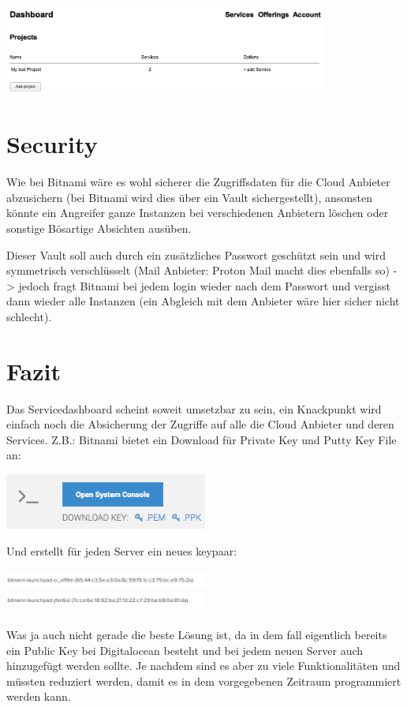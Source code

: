 \documentclass[11pt]{scrartcl}
\begin{document}
\includegraphics[width=0.8\textwidth]{account_projects.png}


\section{Security}
Wie bei Bitnami wäre es wohl sicherer die Zugriffsdaten für die Cloud Anbieter 
abzusichern (bei Bitnami wird dies über ein Vault sichergestellt), ansonsten 
könnte ein Angreifer ganze Instanzen bei verschiedenen Anbietern löschen oder 
sonstige Bösartige Absichten ausüben.

Dieser Vault soll auch durch ein zusätzliches Passwort geschützt sein und 
wird symmetrisch verschlüsselt (Mail Anbieter: Proton Mail macht dies ebenfalls 
so) -> jedoch fragt Bitnami bei jedem login wieder nach dem Passwort und 
vergisst dann wieder alle Instanzen (ein Abgleich mit dem Anbieter wäre hier sicher nicht 
schlecht).

\section{Fazit}
Das Servicedashboard scheint soweit umsetzbar zu sein, ein Knackpunkt wird 
einfach noch die Absicherung der Zugriffe auf alle die Cloud Anbieter und deren 
Services.
Z.B.: Bitnami bietet ein Download für Private Key und Putty Key File an:

\includegraphics[width=0.5\textwidth]{bitnami_private_key}

Und erstellt für jeden Server ein neues keypaar:

\includegraphics[width=0.5\textwidth]{bitnami_key}

Was ja auch nicht gerade die beste Lösung ist, da in dem fall eigentlich bereits 
ein Public Key bei Digitalocean besteht und bei jedem neuen Server auch 
hinzugefügt werden sollte.
Je nachdem sind es aber zu viele Funktionalitäten und müssten reduziert werden, 
damit es in dem vorgegebenen Zeitraum programmiert werden kann.
\end{document}
